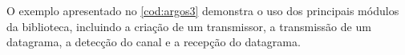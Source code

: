 \begin{apendicesenv}


O exemplo apresentado no \autoref{cod:argos3} demonstra o uso dos principais módulos da biblioteca, incluindo a criação de um transmissor, a transmissão de um datagrama, a detecção do canal e a recepção do datagrama.



\end{apendicesenv}
